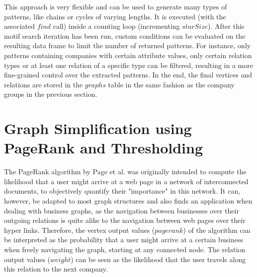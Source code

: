 \documentclass[
        a4paper,     %
        titlepage,   %
        oneside,     %
        parskip      %
]{scrartcl}          %
\begin{document}
  This approach is very flexible and can be used to generate many types of patterns,
  like chains or cycles of varying lengths. It is executed (with the associated $find$ call)
  inside a counting loop (incrementing $starSize$).
  After this motif search iteration has been run,
  custom conditions can be evaluated on the resulting data frame to limit
  the number of returned patterns. For instance, only patterns containing companies
  with certain attribute values, only certain relation types or at least
  one relation of a specific type can be filtered, resulting in a more fine-grained control
  over the extracted patterns.
  In the end, the final vertices and relations are stored in the $graphs$ table in the same
  fashion as the company groups in the previous section.

  \section{Graph Simplification using PageRank and Thresholding}
  \label{sec:graph_simplification}
  The PageRank algorithm by Page et al. \cite{pagerank1999} was originally intended
  to compute the likelihood that a user might arrive at a web page
  in a network of interconnected documents, to objectively quantify their "importance" in this network.
  It can, however, be adapted to most
  graph structures and also finds an application when dealing with business graphs,
  as the navigation between businesses over their outgoing relations is quite
  alike to the navigation between web pages over their hyper links.
  Therefore, the vertex output values ($pagerank$) of the algorithm can be interpreted as the
  probability that a user might arrive at a certain business when freely
  navigating the graph, starting at any connected node.
  The relation output values ($weight$) can be seen as the likelihood that the user
  travels along this relation to the next company.
\end{document}

